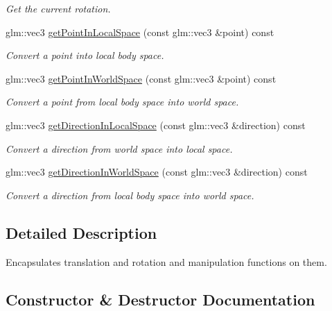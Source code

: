 \begin{DoxyCompactItemize}
\begin{DoxyCompactList}\small\item\em Get the current rotation. \end{DoxyCompactList}\item 
glm\+::vec3 \mbox{\hyperlink{classr3_1_1_transform3_d_a7c6348081c8c1b4d36af89fa7fe2103d}{get\+Point\+In\+Local\+Space}} (const glm\+::vec3 \&point) const
\begin{DoxyCompactList}\small\item\em Convert a point into local body space. \end{DoxyCompactList}\item 
glm\+::vec3 \mbox{\hyperlink{classr3_1_1_transform3_d_a4ecfb0e1518fbeaaa838da02402d0bd9}{get\+Point\+In\+World\+Space}} (const glm\+::vec3 \&point) const
\begin{DoxyCompactList}\small\item\em Convert a point from local body space into world space. \end{DoxyCompactList}\item 
glm\+::vec3 \mbox{\hyperlink{classr3_1_1_transform3_d_ac942055c92499597d01b309b4068917e}{get\+Direction\+In\+Local\+Space}} (const glm\+::vec3 \&direction) const
\begin{DoxyCompactList}\small\item\em Convert a direction from world space into local space. \end{DoxyCompactList}\item 
glm\+::vec3 \mbox{\hyperlink{classr3_1_1_transform3_d_a16c5747e86d579935b808a15f4804b2f}{get\+Direction\+In\+World\+Space}} (const glm\+::vec3 \&direction) const
\begin{DoxyCompactList}\small\item\em Convert a direction from local body space into world space. \end{DoxyCompactList}\end{DoxyCompactItemize}


\subsection{Detailed Description}
Encapsulates translation and rotation and manipulation functions on them. 

\subsection{Constructor \& Destructor Documentation}
\mbox{\label{classr3_1_1_transform3_d_ab43888860ef5d5c124e185124cc681b5}} 
